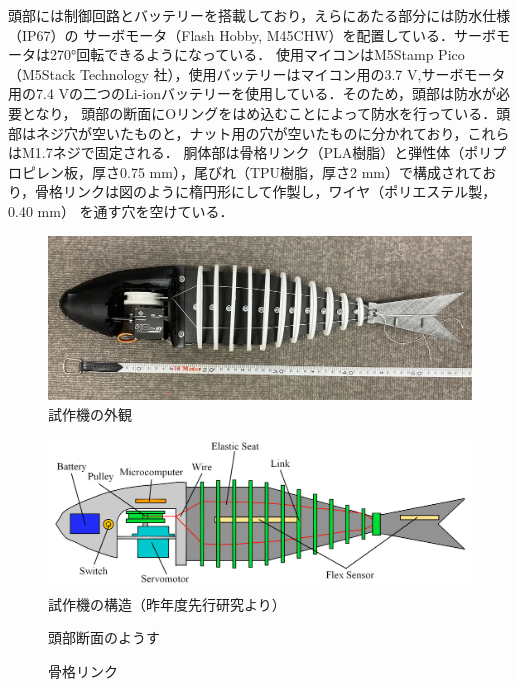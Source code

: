 頭部には制御回路とバッテリーを搭載しており，えらにあたる部分には防水仕様（IP67）の サーボモータ（Flash Hobby, M45CHW）を配置している．サーボモータは270°回転できるようになっている．
使用マイコンはM5Stamp Pico（M5Stack Technology 社），使用バッテリーはマイコン用の3.7 V,サーボモータ用の7.4 Vの二つのLi-ionバッテリーを使用している．そのため，頭部は防水が必要となり，
頭部の断面にOリングをはめ込むことによって防水を行っている．頭部はネジ穴が空いたものと，ナット用の穴が空いたものに分かれており，これらはM1.7ネジで固定される．
胴体部は骨格リンク（PLA樹脂）と弾性体（ポリプロピレン板，厚さ0.75 mm），尾びれ（TPU樹脂，厚さ2 mm）で構成されており，骨格リンクは図のように楕円形にして作製し，ワイヤ（ポリエステル製，0.40 mm）
を通す穴を空けている．

\begin{figure}[t]
    \centering
    \includegraphics[width=0.80\linewidth]{chapters/picture/sisaku.jpg}
    \caption{試作機の外観}
    \label{fig:sisaku}
\end{figure}
\begin{figure}[t]
    \centering
    \includegraphics[width=0.80\linewidth]{chapters/picture/tentativeschematic.png}
    \caption{試作機の構造（昨年度先行研究より）}
    \label{fig:kouzou_sisaku}
\end{figure}
\begin{figure}[t]
    \centering
     \begin{minipage}[b]{0.50\linewidth}
        \centering
        \caption{頭部断面のようす}
        \label{fig:danmen}
     \end{minipage}
     \hspace{0.05\linewidth}
     \begin{minipage}[b]{0.25\linewidth}
        \centering
        \caption{骨格リンク}
        \label{fig:link_sen}
     \end{minipage}
\end{figure}

